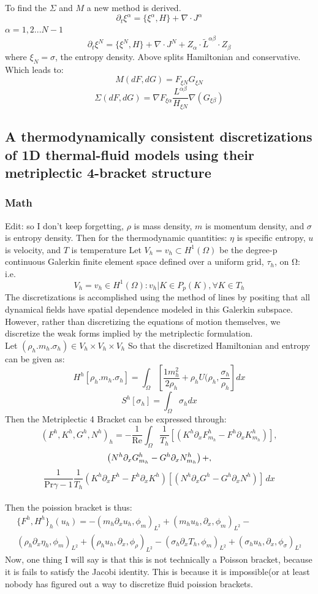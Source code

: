 To find the $\Sigma$ and $M$ a new method is derived. 
$$\partial_t \xi^\alpha= \{\xi^\alpha , H\} + \nabla \cdot J^\alpha$$
$\alpha = 1, 2... N-1$
$$\partial_t \xi^N= \{\xi^N , H\} + \nabla \cdot J^N+Z_\alpha \cdot \tilde{L}^{\alpha \beta} \cdot Z_\beta$$
where $\xi_N = \sigma$, the entropy density. Above splits Hamiltonian and conservative.
Which leads to:
$$M(dF, dG)=F_{\xi N}G_{\xi N}$$
$$\Sigma(dF, dG)=\nabla F_{\xi \alpha }\frac{L^{\alpha \beta}}{H_{\xi N}}\nabla (G_{\xi \beta})$$
\subsection{A thermodynamically consistent discretizations of 1D thermal-fluid
models using their metriplectic 4-bracket structure}
\subsubsection{Math}
Edit: so I don't keep forgetting, $\rho$ is mass density, $m$ is momentum density, and $\sigma$ is entropy density. Then for the thermodynamic quantities: $\eta$ is specific entropy, $u$ is velocity, and $T$ is temperature 
 Let $V_h = v_h \subset H^1(\Omega)$ be the degree-p continuous
 Galerkin finite element space defined over a uniform grid, $\tau_h $, on Ω: i.e.
 $$V_h = {v_h  \in H^1(\Omega) : v_h|K \in P_p(K), \forall K \in T_h}$$
  The discretizations is accomplished
 using the method of lines by positing that all dynamical fields have spatial dependence modeled
 in this Galerkin subspace. However, rather than discretizing the equations of motion themselves,
 we discretize the weak forms implied by the metriplectic formulation.
\\
 Let $(\rho_h. m_h. \sigma_h) \in V_h \times V_h \times V_h$
 So that the discretized Hamiltonian and entropy can be given as:
 $$H^h[\rho_h. m_h. \sigma_h]= \int_\Omega [\frac{1m^2_h}{2 \rho_h}+\rho_h U (\rho_h, \frac{\sigma_h}{\rho_h}]dx$$
 $$S^h[\sigma_h]=\int_\Omega \sigma_h dx$$
 Then the Metriplectic 4 Bracket can be expressed through:
 $$(F^h, K^h, G^h, N^h)_h = -\frac{1}{\text{Re}} \int_{\Omega} \frac{1}{T_h} \left[ \left( K^h \partial_x F^h_{m_h} - F^h \partial_x K^h_{m_h} \right) \right], $$
 $$\left( N^h \partial_x G^h_{m_h} - G^h \partial_x N^h_{m_h} \right)  \\
 +, $$
$$ \frac{1}{\text{Pr} \gamma - 1} \frac{1}{T_h} \left( K^h \partial_x F^h - F^h \partial_x K^h \right) \left[ \left( N^h \partial_x G^h - G^h \partial_x N^h \right) \right] \, dx $$
\\
Then the poission bracket is thus:
\begin{align*}
\{F^h, H^h\}_h(u_h)= - (m_h \partial_x u_h, \phi_m)_{L^2} + (m_h u_h, \partial_x , \phi_m)_{L^2} - \\ (\rho_h \partial_x \eta_h, \phi_m)_{L^2}  + (\rho_h u_h, \partial_x , \phi_\rho)_{L^2} - (\sigma_h\partial_x T_h, \phi_m)_{L^2} + (\sigma_h u_h, \partial_x, \phi_\sigma)_{L^2}
\end{align*}
Now, one thing I will say is that this is not technically a Poisson bracket, because it is fails to satisfy the Jacobi identity. This is because it is impossible(or at least nobody has figured out a way to discretize fluid poission brackets.

